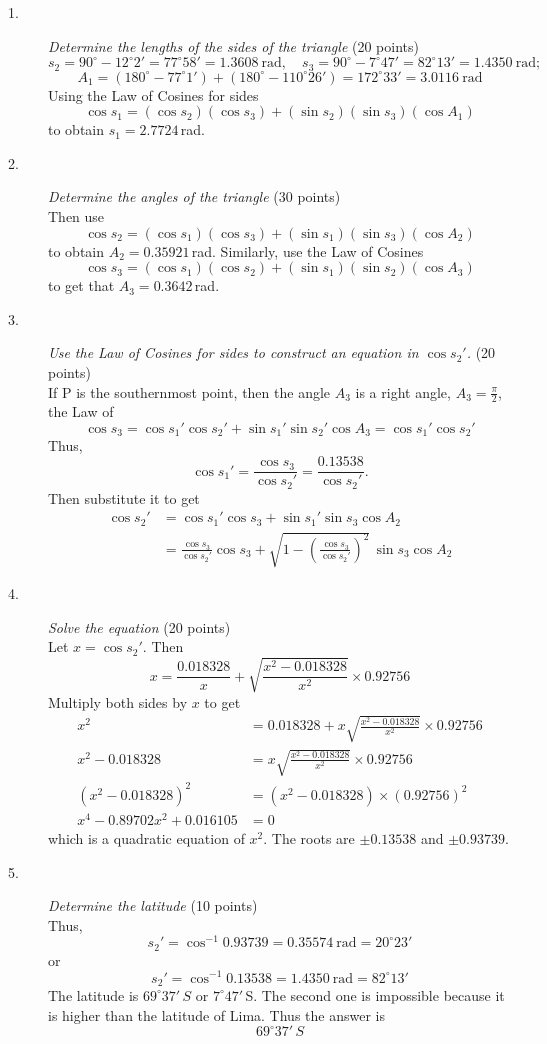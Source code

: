 \begin{description}
\item[1.] \emph{Determine the lengths of the sides of the triangle}
  \hfill(20 points)\\
  \[ s_2 = 90^\circ - 12^\circ 2' = 77^\circ 58' = 1.3608\ \mathrm{rad},\quad
     s_3 = 90^\circ - 7^\circ 47' = 82^\circ 13' = 1.4350\ \mathrm{rad}; \]
  \[ A_1 = (180^\circ - 77^\circ 1') + (180^\circ - 110^\circ 26')
     = 172^\circ 33' = 3.0116\ \mathrm{rad} \]
  Using the Law of Cosines for sides
  \[ \cos s_1 = (\cos s_2)(\cos s_3) + (\sin s_2)(\sin s_3)(\cos A_1) \]
  to obtain $s_1 = 2.7724$\,rad.
\item[2.] \emph{Determine the angles of the triangle} \hfill(30 points)\\
  Then use
  \[ \cos s_2 = (\cos s_1)(\cos s_3) + (\sin s_1)(\sin s_3)(\cos A_2) \]
  to obtain $A_2 = 0.35921$\,rad. Similarly, use the Law of Cosines
  \[ \cos s_3 = (\cos s_1)(\cos s_2) + (\sin s_1)(\sin s_2)(\cos A_3) \]
  to get that $A_3 = 0.3642$\,rad.
\item[3.] \emph{Use the Law of Cosines for sides to construct an equation in
  $\cos s_2'$.} \hfill(20 points)\\
  If P is the southernmost point, then the angle $A_3$ is a right angle,
  $A_3 = \frac{\pi}{2}$, the Law of
  \[ \cos s_3 = \cos s_1' \cos s_2' + \sin s_1' \sin s_2' \cos A_3
     = \cos s_1' \cos s_2' \]
  Thus,
  \[ \cos s_1' = \frac{\cos s_3}{\cos s_2'}
     = \frac{0.13538}{\cos s_2'}. \]
  Then substitute it to get
  \begin{align*}
  \cos s_2' &= \cos s_1' \cos s_3 + \sin s_1' \sin s_3 \cos A_2\\
    &= \frac{\cos s_3}{\cos s_2'}\cos s_3
     + \sqrt{1 - \left(\frac{\cos s_3}{\cos s_2'}\right)^{2}}\,
       \sin s_3 \cos A_2
  \end{align*}
\item[4.] \emph{Solve the equation} \hfill(20 points)\\
  Let $x = \cos s_2'$. Then
  \[ x = \frac{0.018328}{x}
     + \sqrt{\frac{x^2 - 0.018328}{x^2}} \times 0.92756 \]
  Multiply both sides by $x$ to get
  \begin{align*}
  x^2 &= 0.018328
     + x\sqrt{\frac{x^2 - 0.018328}{x^2}} \times 0.92756\\
  x^2 - 0.018328 &= x\sqrt{\frac{x^2 - 0.018328}{x^2}} \times 0.92756\\
  (x^2 - 0.018328)^2 &= (x^2 - 0.018328) \times (0.92756)^2\\
  x^4 - 0.89702x^2 + 0.016105 &= 0
  \end{align*}
  which is a quadratic equation of $x^2$. The roots are $\pm 0.13538$ and
  $\pm 0.93739$.
\item[5.] \emph{Determine the latitude} \hfill(10 points)\\
  Thus,
  \[ s_2' = \cos^{-1} 0.93739 = 0.35574\ \mathrm{rad} = 20^\circ 23' \]
  or
  \[ s_2' = \cos^{-1} 0.13538 = 1.4350\ \mathrm{rad} = 82^\circ 13' \]
  The latitude is $69^\circ 37'\,S$ or $7^\circ 47'$\,S. The second one is
  impossible because it is higher than the latitude of Lima. Thus the answer
  is
  \[ 69^\circ 37'\,S \]
\end{description}

